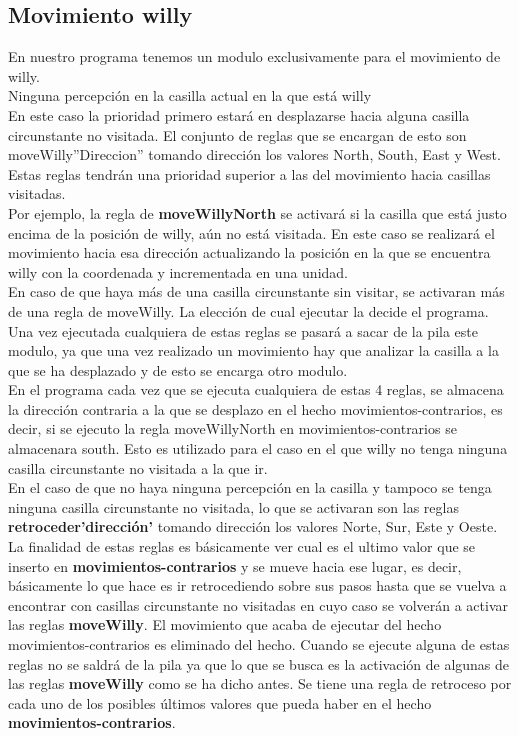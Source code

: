 \documentclass[a4paper,10pt]{article}
\begin{document}
\subsection{Movimiento willy}
En nuestro programa tenemos un modulo exclusivamente para el movimiento de willy.
\vspace{0.5 cm}\\
Ninguna percepción en la casilla actual en la que está willy
\vspace{0.5 cm}\\
En este caso la prioridad primero estará en desplazarse hacia alguna casilla circunstante no visitada. El conjunto de reglas que se encargan de esto son moveWilly”Direccion” tomando dirección los valores North, South, East y West.
\vspace{0.5 cm}\\
Estas reglas tendrán una prioridad superior a las del movimiento hacia casillas visitadas.
\vspace{0.5 cm}\\
Por ejemplo, la regla de {\bf moveWillyNorth} se activará si la casilla que está justo encima de la posición de willy, aún no está visitada. En este caso se realizará el movimiento hacia esa dirección actualizando la posición en la que se encuentra willy con la coordenada y incrementada en una unidad.
\vspace{0.5 cm}\\
En caso de que haya más de una casilla circunstante sin visitar, se activaran más de una regla de moveWilly. La elección de cual ejecutar la decide el programa. Una vez ejecutada cualquiera de estas reglas se pasará a sacar de la pila este modulo, ya que una vez realizado un movimiento hay que analizar la casilla a la que se ha desplazado y de esto se encarga otro modulo.
\vspace{0.5 cm}\\
En el programa cada vez que se ejecuta cualquiera de estas 4 reglas, se almacena la dirección contraria a la que se desplazo en el hecho movimientos-contrarios, es decir, si se ejecuto la regla moveWillyNorth en movimientos-contrarios se almacenara south. Esto es utilizado para el caso en el que willy no tenga ninguna casilla circunstante no visitada a la que ir.
\vspace{0.5 cm}\\
En el caso de que no haya ninguna percepción en la casilla y tampoco se tenga ninguna casilla circunstante no visitada, lo que se activaran son las reglas {\bf retroceder'dirección'} tomando dirección los valores Norte, Sur, Este y Oeste. La finalidad de estas reglas es básicamente ver cual es el ultimo valor que se inserto en {\bf movimientos-contrarios} y se mueve hacia ese lugar, es decir, básicamente lo que hace es ir retrocediendo sobre sus pasos hasta que se vuelva a encontrar con casillas circunstante no visitadas en cuyo caso se volverán a activar las reglas {\bf moveWilly}.
El movimiento que acaba de ejecutar del hecho movimientos-contrarios es eliminado del hecho.
Cuando se ejecute alguna de estas reglas no se saldrá de la pila ya que lo que se busca es la activación de algunas de las reglas {\bf moveWilly} como se ha dicho antes.  Se tiene una regla de retroceso por cada uno de los posibles últimos valores que pueda haber en el hecho {\bf movimientos-contrarios}.
\end{document}
